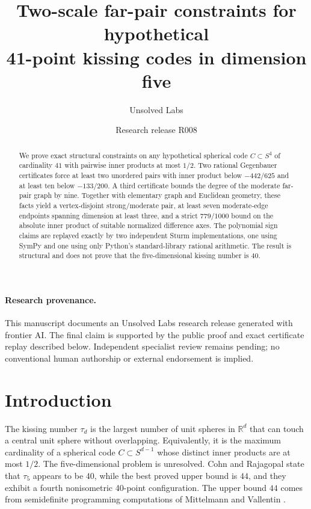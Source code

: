 \documentclass[11pt]{article}
\title{Two-scale far-pair constraints for hypothetical\\
41-point kissing codes in dimension five}
\author{Unsolved Labs}
\date{Research release R008}
\begin{document}
\maketitle

\begin{abstract}
We prove exact structural constraints on any hypothetical spherical code
$C\subset S^4$ of cardinality $41$ with pairwise inner products at most
$1/2$. Two rational Gegenbauer certificates force at least two unordered
pairs with inner product below $-442/625$ and at least ten below $-133/200$.
A third certificate bounds the degree of the moderate far-pair graph by nine.
Together with elementary graph and Euclidean geometry, these facts yield a
vertex-disjoint strong/moderate pair, at least seven moderate-edge endpoints
spanning dimension at least three, and a strict $779/1000$ bound on the
absolute inner product of suitable normalized difference axes. The
polynomial sign claims are replayed exactly by two independent Sturm
implementations, one using SymPy and one using only Python's standard-library
rational arithmetic. The result is structural and does not prove that the
five-dimensional kissing number is $40$.
\end{abstract}

\paragraph{Research provenance.}
This manuscript documents an Unsolved Labs research release generated with
frontier AI. The final claim is supported by the public proof and exact
certificate replay described below. Independent specialist review remains
pending; no conventional human authorship or external endorsement is implied.

\section{Introduction}

The kissing number $\tau_d$ is the largest number of unit spheres in
$\mathbb R^d$ that can touch a central unit sphere without overlapping.
Equivalently, it is the maximum cardinality of a spherical code
$C\subset S^{d-1}$ whose distinct inner products are at most $1/2$.
The five-dimensional problem is unresolved. Cohn and Rajagopal
\cite{cohnrajagopal2026} state that $\tau_5$ appears to be $40$, while the
best proved upper bound is $44$, and they exhibit a fourth nonisometric
40-point configuration. The upper bound $44$ comes from semidefinite
programming computations of Mittelmann and Vallentin
\cite{mittelmannvallentin2010}.
\end{document}
